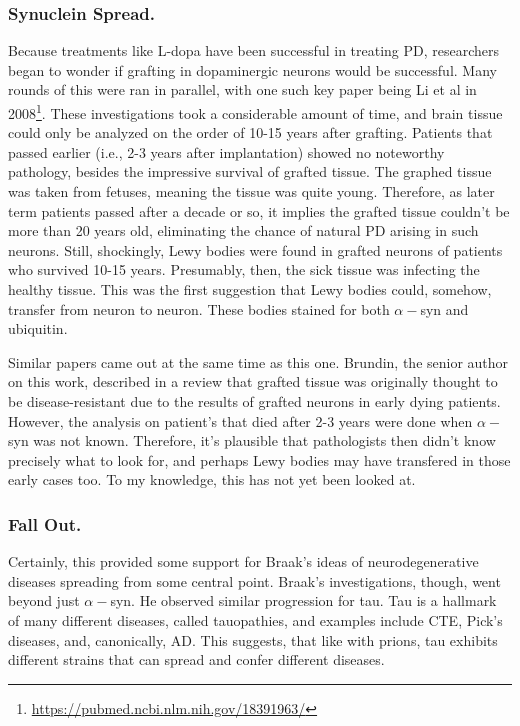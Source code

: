 \subsubsection*{Synuclein Spread.}

Because treatments like L-dopa have been successful in treating PD, researchers began to wonder if grafting in dopaminergic neurons would be successful. Many rounds of this were ran in parallel, with one such key paper being Li et al in 2008\footnote{\url{https://pubmed.ncbi.nlm.nih.gov/18391963/}}. These investigations took a considerable amount of time, and brain tissue could only be analyzed on the order of 10-15 years after grafting. Patients that passed earlier (i.e., 2-3 years after implantation) showed no noteworthy pathology, besides the impressive survival of grafted tissue. The graphed tissue was taken from fetuses, meaning the tissue was quite young. Therefore, as later term patients passed after a decade or so, it implies the grafted tissue couldn't be more than 20 years old, eliminating the chance of natural PD arising in such neurons. Still, shockingly, Lewy bodies were found in grafted neurons of patients who survived 10-15 years. Presumably, then, the sick tissue was infecting the healthy tissue. This was the first suggestion that Lewy bodies could, somehow, transfer from neuron to neuron. These bodies stained for both $\alpha-$syn and ubiquitin.\newline

Similar papers came out at the same time as this one. Brundin, the senior author on this work, described in a review that grafted tissue was originally thought to be disease-resistant due to the results of grafted neurons in early dying patients. However, the analysis on patient's that died after 2-3 years were done when $\alpha-$syn was not known. Therefore, it's plausible that pathologists then didn't know precisely what to look for, and perhaps Lewy bodies may have transfered in those early cases too. To my knowledge, this has not yet been looked at.

\subsubsection*{Fall Out.}

Certainly, this provided some support for Braak's ideas of neurodegenerative diseases spreading from some central point. Braak's investigations, though, went beyond just $\alpha-$syn. He observed similar progression for tau. Tau is a hallmark of many different diseases, called tauopathies, and examples include CTE, Pick's diseases, and, canonically, AD. This suggests, that like with prions, tau exhibits different strains that can spread and confer different diseases. 


